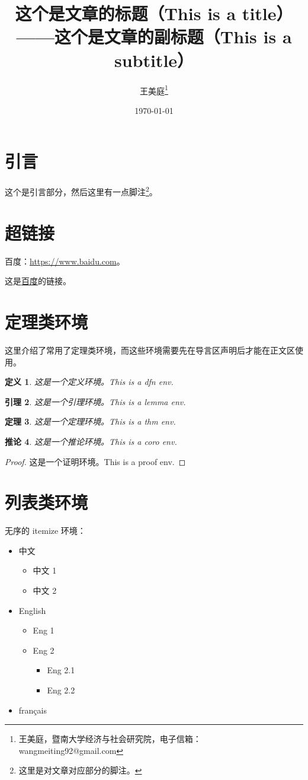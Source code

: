 \documentclass[UTF8,hyperref,space=auto]{ctexart} %
\title{
	这个是文章的标题（This is a title）\\
	\large ——这个是文章的副标题（This is a subtitle）
}
\author{王美庭\thanks{王美庭，暨南大学经济与社会研究院，电子信箱：wangmeiting92@gmail.com}} %
\date{\today}
\theoremstyle{plain}
\newtheorem{definition}{定义}
\theoremstyle{plain}
\newtheorem{lemma}[definition]{引理}
\theoremstyle{plain}
\newtheorem{theorem}[definition]{定理}
\theoremstyle{plain}
\newtheorem{corollary}[definition]{推论}
\theoremstyle{nonumberplain}
\newtheorem{proof}{证明}
\begin{document}
\maketitle

\tableofcontents

\section{引言}
这个是引言部分，然后这里有一点脚注\footnote{这里是对文章对应部分的脚注。}。

\section{超链接}
百度：\url{https://www.baidu.com}。

这是\href{https://www.baidu.com}{百度}的链接。

\section{定理类环境}
这里介绍了常用了定理类环境，而这些环境需要先在导言区声明后才能在正文区使用。

\begin{definition}
	这是一个定义环境。This is a dfn env.
\end{definition}

\begin{lemma}
	这是一个引理环境。This is a lemma env.
\end{lemma}

\begin{theorem}
	这是一个定理环境。This is a thm env.
\end{theorem}

\begin{corollary}
	这是一个推论环境。This is a coro env.
\end{corollary}

\begin{proof}
	这是一个证明环境。This is a proof env.
\end{proof}


\section{列表类环境}
无序的 itemize 环境：
\begin{itemize}
	\item 中文
	\begin{itemize}
		\item 中文 1
		\item 中文 2
	\end{itemize}
	\item English
	\begin{itemize}
		\item Eng 1
		\item Eng 2
		\begin{itemize}
			\item Eng 2.1
			\item Eng 2.2
		\end{itemize}
	\end{itemize}
	\item français
\end{itemize}
\end{document}
